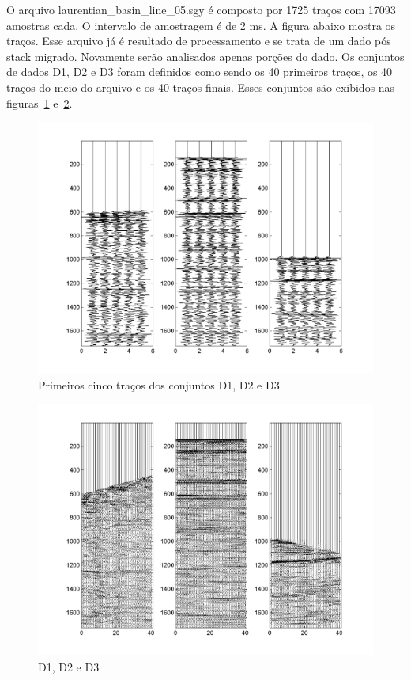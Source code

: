 O arquivo laurentian\_basin\_line\_05.sgy é composto por 1725 traços com 17093
amostras cada. O intervalo de amostragem é de 2 ms. A figura abaixo mostra os
traços. Esse arquivo já é resultado de processamento e se trata de um dado pós
stack migrado. Novamente serão analisados apenas porções do dado. Os conjuntos
de dados D1, D2 e D3 foram definidos como sendo os 40 primeiros traços, os 40
traços do meio do arquivo e os 40 traços finais. Esses conjuntos são exibidos
nas figuras~\ref{Figura:d1d2d3} e~\ref{Figura:d1d2d3comp}.

\begin{figure}[!h]
\centering
  \includegraphics[scale=1.01]{fig/fig_D1.png}
  \caption{Primeiros cinco traços dos conjuntos D1, D2 e D3}
  \label{Figura:d1d2d3}
\end{figure}

\begin{figure}[!h]
\centering
\includegraphics[scale=1.01]{fig/fig_D2.png}
\caption{D1, D2 e D3}
\label{Figura:d1d2d3comp}
\end{figure}

